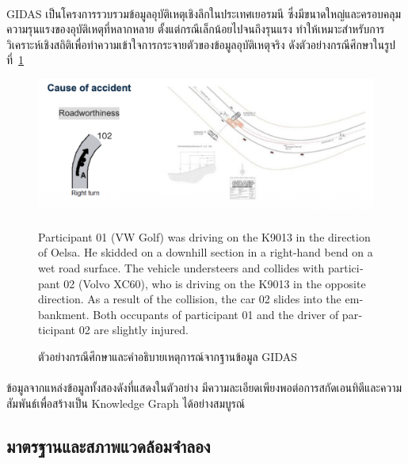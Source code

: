 \paragraph{}
GIDAS เป็นโครงการรวบรวมข้อมูลอุบัติเหตุเชิงลึกในประเทศเยอรมนี \cite{gidas_study} ซึ่งมีขนาดใหญ่และครอบคลุมความรุนแรงของอุบัติเหตุที่หลากหลาย ตั้งแต่กรณีเล็กน้อยไปจนถึงรุนแรง ทำให้เหมาะสำหรับการวิเคราะห์เชิงสถิติเพื่อทำความเข้าใจการกระจายตัวของข้อมูลอุบัติเหตุจริง ดังตัวอย่างกรณีศึกษาในรูปที่~\ref{fig:gidas_example}

\begin{figure}[h!]
    \centering
    \begin{minipage}{0.48\textwidth}
        \includegraphics[width=\linewidth]{images/gidas-case-example}
    \end{minipage}\hfill
    \begin{minipage}{0.48\textwidth}
        \footnotesize
        \textenglish{Participant 01 (VW Golf) was driving on the K9013 in the direction of Oelsa. He skidded on a downhill section in a right-hand bend on a wet road surface. The vehicle understeers and collides with participant 02 (Volvo XC60), who is driving on the K9013 in the opposite direction. As a result of the collision, the car 02 slides into the embankment. Both occupants of participant 01 and the driver of participant 02 are slightly injured.}
    \end{minipage}
    \caption{ตัวอย่างกรณีศึกษาและคำอธิบายเหตุการณ์จากฐานข้อมูล GIDAS}
    \label{fig:gidas_example}
\end{figure}

\paragraph{}
ข้อมูลจากแหล่งข้อมูลทั้งสองดังที่แสดงในตัวอย่าง มีความละเอียดเพียงพอต่อการสกัดเอนทิตีและความสัมพันธ์เพื่อสร้างเป็น Knowledge Graph ได้อย่างสมบูรณ์

\subsection{มาตรฐานและสภาพแวดล้อมจำลอง}\label{subsec:ch2_standards}
